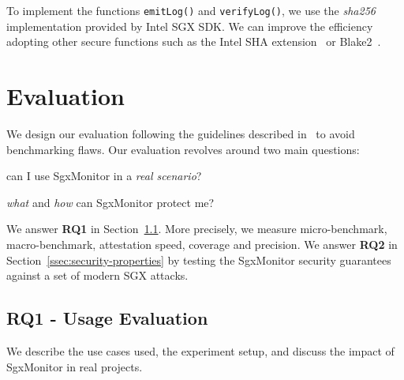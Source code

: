 To implement the functions \texttt{emitLog()} and \texttt{verifyLog()}, we use
the \emph{sha256} implementation provided by Intel SGX SDK.
We can improve the efficiency adopting other
secure functions such as the Intel SHA extension~\citep{gulley2013intel} or 
Blake2~\citep{aumasson2013blake2}.



\section{Evaluation}
\label{sec:evaluation}

We design our evaluation following the guidelines described 
in~\citep{van2019sok} to avoid benchmarking flaws.
Our evaluation revolves around two main questions:
\begin{enumerate*}[label=(\textbf{RQ\arabic*})]
	\item can I use SgxMonitor in a \emph{real scenario}?
	\item \emph{what} and \emph{how} can SgxMonitor protect me?
\end{enumerate*}
We answer \textbf{RQ1} in Section~\ref{ssec:usage-evaluation}.
More precisely, we measure micro-benchmark, macro-benchmark, attestation speed, 
coverage and precision.
We answer \textbf{RQ2} in Section~\ref{ssec:security-properties} by testing 
the SgxMonitor security guarantees against a set of modern SGX attacks.

\subsection{RQ1 - Usage Evaluation}
\label{ssec:usage-evaluation}

We describe the use cases used, the experiment setup, and discuss the 
impact of SgxMonitor in real projects.

